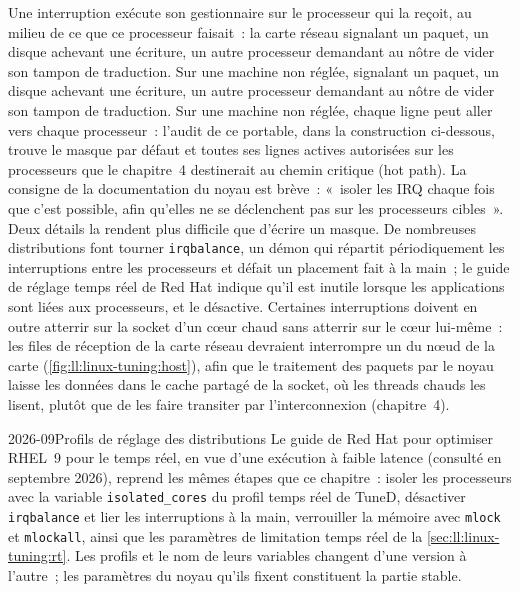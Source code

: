 Une interruption exécute son gestionnaire sur le processeur qui la reçoit, au milieu de ce que ce processeur faisait~: la carte réseau signalant un paquet, un disque achevant une écriture, un autre processeur demandant au nôtre de vider son tampon de traduction. Sur une machine non réglée,
signalant un paquet, un disque achevant une écriture, un autre processeur demandant au nôtre de vider son tampon de traduction. Sur une machine non réglée,
chaque ligne peut aller vers chaque processeur~: l'audit de ce portable, dans la construction ci-dessous, trouve le masque par défaut et toutes ses
lignes actives autorisées sur les processeurs que le chapitre~4 destinerait au chemin critique (hot path). La consigne de la documentation du noyau est brève~:
«~isoler les IRQ chaque fois que c'est possible, afin qu'elles ne se déclenchent pas sur les processeurs cibles~». Deux détails la rendent plus difficile que d'écrire un
masque. De nombreuses distributions font tourner \texttt{irqbalance}, un démon qui répartit périodiquement les interruptions entre les processeurs et défait
un placement fait à la main~; le guide de réglage temps réel de Red Hat indique qu'il est inutile lorsque les applications sont liées aux processeurs, et
le désactive. Certaines interruptions doivent en outre atterrir sur la socket d'un cœur chaud sans atterrir sur le cœur lui-même~: les files de réception de la carte réseau devraient
interrompre un  du nœud de la carte (\cref{fig:ll:linux-tuning:host}), afin que le traitement des paquets par le noyau
laisse les données dans le cache partagé de la socket, où les threads chauds les lisent, plutôt que de les faire transiter par l'interconnexion
(chapitre~4).

\begin{dated}{2026-09}{Profils de réglage des distributions}\label{dat:ll:linux-tuning:rhel}
Le guide de Red Hat pour optimiser RHEL~9 pour le temps réel, en vue d'une exécution à faible latence (consulté en septembre 2026), reprend les
mêmes étapes que ce chapitre~: isoler les processeurs avec la variable \texttt{isolated\_cores} du profil temps réel de TuneD, désactiver
\texttt{irqbalance} et lier les interruptions à la main, verrouiller la mémoire avec \texttt{mlock} et \texttt{mlockall}, ainsi que les paramètres de limitation temps réel
de la \cref{sec:ll:linux-tuning:rt}. Les profils et le nom de leurs variables changent d'une version à l'autre~; les paramètres du noyau qu'ils fixent
constituent la partie stable.
\end{dated}

